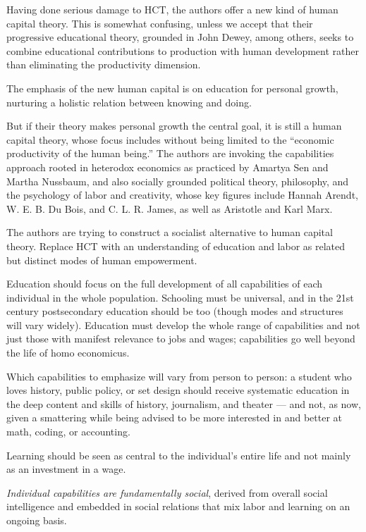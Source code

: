 \documentclass[
]{book}
\begin{document}
Having done serious damage to HCT, the authors offer a new kind of human capital theory. This is somewhat confusing, unless we accept that their progressive educational theory, grounded in John Dewey, among others, seeks to combine educational contributions to production with human development rather than eliminating the productivity dimension.

The emphasis of the new human capital is on education for personal growth, nurturing a holistic relation between knowing and doing.

But if their theory makes personal growth the central goal, it is still a human capital theory, whose focus includes without being limited to the ``economic productivity of the human being.'' The authors are invoking the capabilities approach rooted in heterodox economics as practiced by Amartya Sen and Martha Nussbaum, and also socially grounded political theory, philosophy, and the psychology of labor and creativity, whose key figures include Hannah Arendt, W. E. B. Du Bois, and C. L. R. James, as well as Aristotle and Karl Marx.

The authors are trying to construct a socialist alternative to human capital theory.
Replace HCT with an understanding of education and labor as related but distinct modes of human empowerment.

Education should focus on the full development of all capabilities of each individual in the whole population. Schooling must be universal, and in the 21st century postsecondary education should be too (though modes and structures will vary widely). Education must develop the whole range of capabilities and not just those with manifest relevance to jobs and wages; capabilities go well beyond the life of homo economicus.

Which capabilities to emphasize will vary from person to person: a student who loves history, public policy, or set design should receive systematic education in the deep content and skills of history, journalism, and theater --- and not, as now, given a smattering while being advised to be more interested in and better at math, coding, or accounting.

Learning should be seen as central to the individual's entire life and not mainly as an investment in a wage.

\emph{Individual capabilities are fundamentally social}, derived from overall social intelligence and embedded in social relations that mix labor and learning on an ongoing basis.
\end{document}
